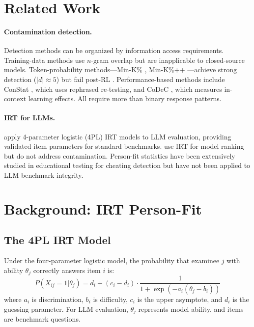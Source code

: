 \documentclass[11pt,a4paper]{article}
\begin{document}
\section{Related Work}
\label{sec:related}

\paragraph{Contamination detection.}
Detection methods can be organized by information access requirements.
Training-data methods use $n$-gram overlap \citep{brown2020language,dodge2021documenting} but are inapplicable to closed-source models.
Token-probability methods---Min-K\% \citep{shi2024detecting}, Min-K\%++ \citep{zhang2024min}---achieve strong detection ($|d|{\approx}5$) but fail post-RL \citep{wang2025rlcontam}.
Performance-based methods include ConStat \citep{oren2024proving}, which uses rephrased re-testing, and CoDeC \citep{codec2026}, which measures in-context learning effects.
All require more than binary response patterns.

\paragraph{IRT for LLMs.}
\citet{psnirt2026} apply 4-parameter logistic (4PL) IRT models to LLM evaluation, providing validated item parameters for standard benchmarks.
\citet{irt_llm_2024} use IRT for model ranking but do not address contamination.
Person-fit statistics \citep{drasgow1985appropriateness,snijders2001} have been extensively studied in educational testing for cheating detection but have not been applied to LLM benchmark integrity.

\section{Background: IRT Person-Fit}
\label{sec:background}

\subsection{The 4PL IRT Model}

Under the four-parameter logistic model, the probability that examinee $j$ with ability $\theta_j$ correctly answers item $i$ is:
\begin{equation}
P(X_{ij}=1|\theta_j) = d_i + (c_i - d_i) \cdot \frac{1}{1 + \exp(-a_i(\theta_j - b_i))}
\label{eq:4pl}
\end{equation}
where $a_i$ is discrimination, $b_i$ is difficulty, $c_i$ is the upper asymptote, and $d_i$ is the guessing parameter.
For LLM evaluation, $\theta_j$ represents model ability, and items are benchmark questions.
\end{document}
